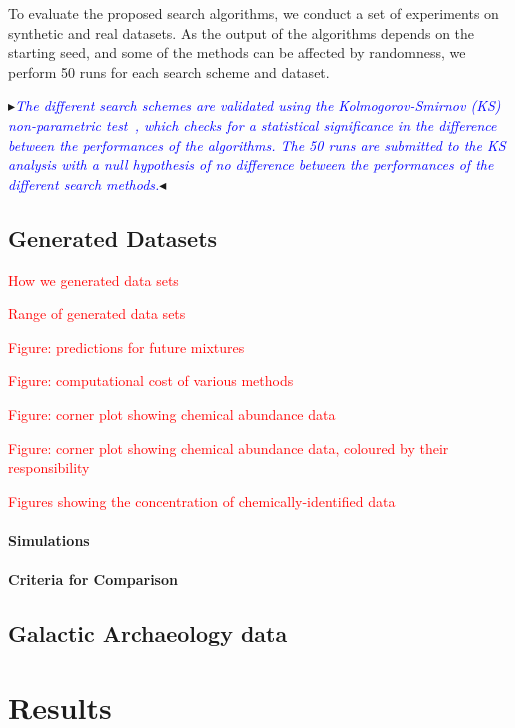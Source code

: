 \documentclass{elsarticle}
\newcommand{\todo}[1]{\textcolor{red}{#1}}
\newcommand{\nbb}[2]{
    \fcolorbox{black}{cyan}{\bfseries\sffamily\scriptsize#1}
    {\sf$\blacktriangleright$\textcolor{blue}{\textit{#2}}$\blacktriangleleft$}
}
\newcommand{\andy}[1]{\nbb{Andy}{#1}}
\begin{document}
To evaluate the proposed search algorithms, we conduct a set of experiments on synthetic and real datasets. As the output of the algorithms depends on the starting seed, and some of the methods can be affected by randomness, we perform 50 runs for each search scheme and dataset. 

\andy{The different search schemes are validated using the Kolmogorov-Smirnov (KS) non-parametric test~\citep{Pettitt77S}, which checks for a statistical significance in the difference between the performances of the algorithms. The 50 runs are submitted to the KS analysis with a null hypothesis of no difference between the performances of the different search methods.}


\subsection{Generated Datasets}

\todo{How we generated data sets}

\todo{Range of generated data sets}

\todo{Figure: predictions for future mixtures}

\todo{Figure: computational cost of various methods}

\todo{Figure: corner plot showing chemical abundance data}

\todo{Figure: corner plot showing chemical abundance data, coloured by their responsibility}

\todo{Figures showing the concentration of chemically-identified data}

\paragraph{Simulations}

\paragraph{Criteria for Comparison}

\subsection{Galactic Archaeology data}

\section{Results}
\end{document}
